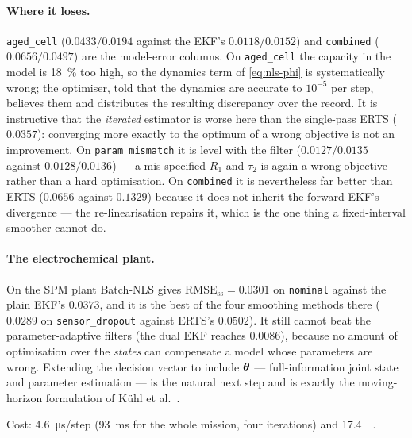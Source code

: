 \paragraph{Where it loses.}  \texttt{aged\_cell} ($0.0433/0.0194$ against the EKF's
$0.0118/0.0152$) and \texttt{combined} ($0.0656/0.0497$) are the model-error columns.  On
\texttt{aged\_cell} the capacity in the model is \SI{18}{\percent} too high, so the dynamics term of
\eqref{eq:nls-phi} is systematically wrong; the optimiser, told that the dynamics are accurate to
$10^{-5}$ per step, believes them and distributes the resulting discrepancy over the record.  It is
instructive that the \emph{iterated} estimator is worse here than the single-pass ERTS ($0.0357$):
converging more exactly to the optimum of a wrong objective is not an improvement.  On
\texttt{param\_mismatch} it is level with the filter ($0.0127/0.0135$ against $0.0128/0.0136$) --- a
mis-specified $R_1$ and $\tau_2$ is again a wrong objective rather than a hard optimisation.  On
\texttt{combined} it is nevertheless far better than ERTS ($0.0656$ against $0.1329$) because it does
not inherit the forward EKF's divergence --- the re-linearisation repairs it, which is the one thing
a fixed-interval smoother cannot do.

\paragraph{The electrochemical plant.}  On the SPM plant Batch-NLS gives
$\text{RMSE}_\text{ss}=0.0301$ on \texttt{nominal} against the plain EKF's $0.0373$, and it is the
best of the four smoothing methods there ($0.0289$ on \texttt{sensor\_dropout} against ERTS's
$0.0502$).  It still cannot beat the parameter-adaptive filters (the dual EKF reaches $0.0086$),
because no amount of optimisation over the \emph{states} can compensate a model whose parameters are
wrong.  Extending the decision vector to include $\bm{\theta}$ --- full-information joint state and
parameter estimation --- is the natural next step and is exactly the moving-horizon formulation of
K\"uhl et al.~\cite{kuhl2011rtimhe}.

Cost: \SI{4.6}{\micro\second}/step (\SI{93}{\milli\second} for the whole mission, four iterations)
and \SI{17.4}{\mega\byte}.

